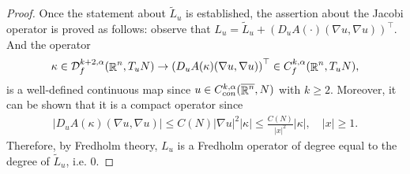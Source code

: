 \documentclass[a4paper,11pt,reqno]{amsart}
\def\R{\mathop{\rm \mathbb{R}}\nolimits}
\begin{document}
\begin{proof}
Once the statement about $\tilde{L}_u$ is established, the assertion about the Jacobi operator is proved as follows: observe that $L_u=\tilde{L}_u+\left(D_uA(\cdot)(\nabla u,\nabla u)\right)^{\top}$.
And the operator $$\kappa\in\mathcal{D}_f^{k+2,\alpha}(\R^n,T_uN)\rightarrow \left(D_uA(\kappa)(\nabla u,\nabla u)\right)^{\top}\in C_f^{k,\alpha}(\R^n,T_uN),$$ is a well-defined continuous map since $u\in C_{con}^{k,\alpha}(\overline{\R^n},N)$ with $k\geq 2$. Moreover, it can be shown that it is a compact operator since 
\begin{eqnarray*}
|D_uA(\kappa)(\nabla u,\nabla u)|\leq C(N)|\nabla u|^2|\kappa|\leq \frac{C(N)}{|x|^2}|\kappa|,\quad |x|\geq 1.
\end{eqnarray*}
Therefore, by Fredholm theory, $L_u$ is a Fredholm operator of degree equal to the degree of $\tilde{L}_u$, i.e. $0$.


\end{proof}
\end{document}
